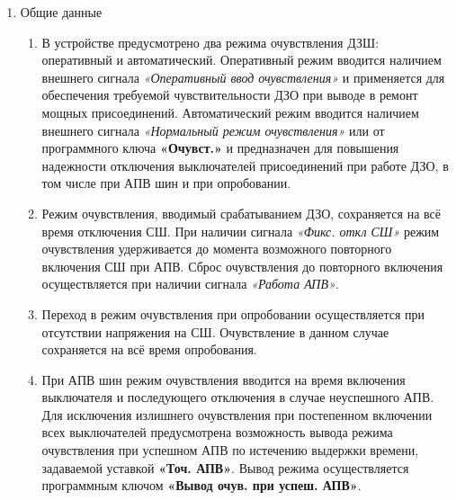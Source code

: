 \color{black}

\begin{enumerate}[label=\arabic{section}.\arabic{subsection}.\arabic{enumi}, labelsep=4pt, leftmargin=0pt, itemindent=57pt, itemsep=0pt, parsep=5pt] %


\item Общие данные

\begin{enumerate}[label=\arabic{section}.\arabic{subsection}.\arabic{enumi}.\arabic*, labelsep=4pt, leftmargin=0em, itemindent=65pt, parsep=0pt]

\item
В устройстве предусмотрено два режима очувствления ДЗШ: оперативный и автоматический.
Оперативный режим вводится наличием внешнего сигнала \textit{«Оперативный ввод очувствления»} и применяется для обеспечения требуемой чувствительности ДЗО при выводе в ремонт мощных присоединений.
Автоматический режим вводится наличием внешнего сигнала \textit{«Нормальный режим очувствления»} или от программного ключа \textbf{«Очувст.»} и предназначен для повышения надежности отключения выключателей присоединений при работе ДЗО, в том числе при АПВ шин и при опробовании.

\item
Режим очувствления, вводимый срабатыванием ДЗО, сохраняется на всё время отключения СШ.
При наличии сигнала \textit{«Фикс. откл СШ»} режим очувствления удерживается до момента возможного повторного включения СШ при АПВ.
Сброс очувствления до повторного включения осуществляется при наличии сигнала \textit{«Работа АПВ»}.

\item
Переход в режим очувствления при опробовании осуществляется при отсутствии напряжения на СШ.
Очувствление в данном случае сохраняется на всё время опробования.

\item
При АПВ шин режим очувствления вводится на время включения выключателя и последующего отключения в случае неуспешного АПВ.
Для исключения излишнего очувствления при постепенном включении всех выключателей предусмотрена возможность вывода режима очувствления при успешном АПВ по истечению выдержки времени, задаваемой уставкой \textbf{«Точ. АПВ»}.
Вывод режима осуществляется программным ключом \textbf{«Вывод очув. при успеш. АПВ»}.


\end{enumerate}
\end{enumerate}
